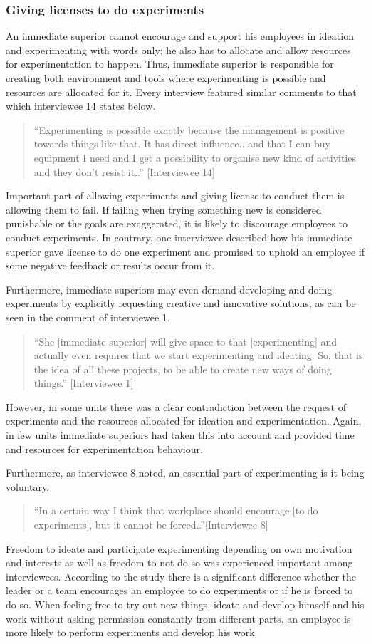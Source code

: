 \subsubsection{Giving licenses to do experiments}
An immediate superior cannot encourage and support his employees in ideation and experimenting with words only; he also has to allocate and allow resources for experimentation to happen. Thus, immediate superior is responsible for creating both environment and tools where experimenting is possible and resources are allocated for it. Every interview featured similar comments to that which interviewee 14 states below. 
\begin{quote}
``Experimenting is possible exactly because the management is positive towards things like that. It has direct influence.. and that I can buy equipment I need and I get a possibility to organise new kind of activities and they don't resist it..'' [Interviewee 14]
\end{quote}
Important part of allowing experiments and giving license to conduct them is allowing them to fail. If failing when trying something new is considered punishable or the goals are exaggerated, it is likely to discourage employees to conduct experiments. In contrary, one interviewee described how his immediate superior gave license to do one experiment and promised to uphold an employee if some negative feedback or results occur from it. 

Furthermore, immediate superiors may even demand developing and doing experiments by explicitly requesting creative and innovative solutions, as can be seen in the comment of interviewee 1. 
\begin{quote}
``She [immediate superior] will give space to that [experimenting] and actually even requires that we start experimenting and ideating. So, that is the idea of all these projects, to be able to create new ways of doing things.'' [Interviewee 1]
\end{quote}
However, in some units there was a clear contradiction between the request of experiments and the resources allocated for ideation and experimentation. Again, in few units immediate superiors had taken this into account and provided time and resources for experimentation behaviour. 

Furthermore, as interviewee 8 noted, an essential part of experimenting is it being voluntary.
\begin{quote}
``In a certain way I think that workplace should encourage [to do experiments], but it cannot be forced..''[Interviewee 8]
\end{quote}
Freedom to ideate and participate experimenting depending on own motivation and interests as well as freedom to not do so was experienced important among interviewees. According to the study there is a significant difference whether the leader or a team encourages an employee to do experiments or if he is forced to do so. When feeling free to try out new things, ideate and develop himself and his work without asking permission constantly from different parts, an employee is more likely to perform experiments and develop his work.


